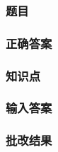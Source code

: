 \begin{frame}
\frametitle{题目}


\end{frame}

\begin{frame}[allowframebreaks]
\frametitle{正确答案}


\end{frame}

\begin{frame}[allowframebreaks]
\frametitle{知识点}


\end{frame}

\begin{frame}[allowframebreaks]
\frametitle{输入答案}


\end{frame}

\begin{frame}[allowframebreaks]
\frametitle{批改结果}


\end{frame}